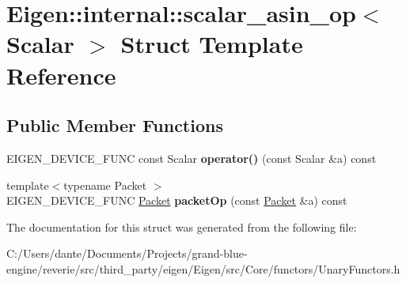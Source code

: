 \hypertarget{struct_eigen_1_1internal_1_1scalar__asin__op}{}\section{Eigen\+::internal\+::scalar\+\_\+asin\+\_\+op$<$ Scalar $>$ Struct Template Reference}
\label{struct_eigen_1_1internal_1_1scalar__asin__op}
\subsection*{Public Member Functions}
\begin{DoxyCompactItemize}
\item 
\mbox{\label{struct_eigen_1_1internal_1_1scalar__asin__op_ae646387bd9b3f531f52cbdb0f10bcb88}} 
E\+I\+G\+E\+N\+\_\+\+D\+E\+V\+I\+C\+E\+\_\+\+F\+U\+NC const Scalar {\bfseries operator()} (const Scalar \&a) const
\item 
\mbox{\label{struct_eigen_1_1internal_1_1scalar__asin__op_a8d6255ec515cd4e441f6f56e180aea10}} 
{\footnotesize template$<$typename Packet $>$ }\\E\+I\+G\+E\+N\+\_\+\+D\+E\+V\+I\+C\+E\+\_\+\+F\+U\+NC \mbox{\hyperlink{union_eigen_1_1internal_1_1_packet}{Packet}} {\bfseries packet\+Op} (const \mbox{\hyperlink{union_eigen_1_1internal_1_1_packet}{Packet}} \&a) const
\end{DoxyCompactItemize}


The documentation for this struct was generated from the following file\+:\begin{DoxyCompactItemize}
\item 
C\+:/\+Users/dante/\+Documents/\+Projects/grand-\/blue-\/engine/reverie/src/third\+\_\+party/eigen/\+Eigen/src/\+Core/functors/Unary\+Functors.\+h\end{DoxyCompactItemize}
